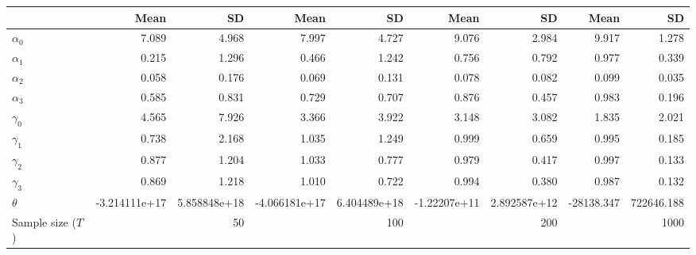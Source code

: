 
\begin{tabular}[t]{lrrrrrrrr}
\toprule
  & Mean & SD & Mean  & SD  & Mean   & SD   & Mean    & SD   \\
\midrule
$\alpha_{0}$ & 7.089 & 4.968 & 7.997 & 4.727 & 9.076 & 2.984 & 9.917 & 1.278\\
$\alpha_{1}$ & 0.215 & 1.296 & 0.466 & 1.242 & 0.756 & 0.792 & 0.977 & 0.339\\
$\alpha_{2}$ & 0.058 & 0.176 & 0.069 & 0.131 & 0.078 & 0.082 & 0.099 & 0.035\\
$\alpha_{3}$ & 0.585 & 0.831 & 0.729 & 0.707 & 0.876 & 0.457 & 0.983 & 0.196\\
$\gamma_{0}$ & 4.565 & 7.926 & 3.366 & 3.922 & 3.148 & 3.082 & 1.835 & 2.021\\
$\gamma_{1}$ & 0.738 & 2.168 & 1.035 & 1.249 & 0.999 & 0.659 & 0.995 & 0.185\\
$\gamma_{2}$ & 0.877 & 1.204 & 1.033 & 0.777 & 0.979 & 0.417 & 0.997 & 0.133\\
$\gamma_{3}$ & 0.869 & 1.218 & 1.010 & 0.722 & 0.994 & 0.380 & 0.987 & 0.132\\
$\theta$ & -3.214111e+17 & 5.858848e+18 & -4.066181e+17 & 6.404489e+18 & -1.22207e+11 & 2.892587e+12 & -28138.347 & 722646.188\\
Sample size ($T$) &  & 50 &  & 100 &  & 200 &  & 1000\\
\bottomrule
\end{tabular}
